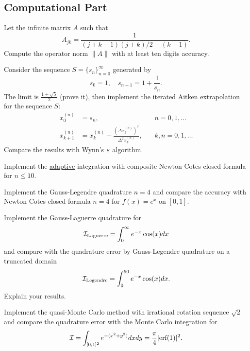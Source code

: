 \subsection{Computational Part}
\begin{problem}
    Let the infinite matrix $A$ such that $$A_{jk} = \frac{1}{(j+k-1)(j+k)/2 - (k-1)}.$$
    Compute the operator norm $\|A\|$ with at least ten digits accuracy.
\end{problem}
\begin{problem}\label{Exer: 4-It-Aitken}
    Consider the sequence $S = \{s_n\}_{n = 0}^{\infty}$ generated by 
    \begin{equation}
        s_0 = 1,\quad s_{n+1} = 1 + \frac{1}{s_{n}}.
    \end{equation}
    The limit is $\frac{1+\sqrt{5}}{2}$ (prove it), then implement the iterated Aitken extrapolation for the sequence $S$: 
    \begin{equation}
    \begin{aligned}
           x_0^{(n)} &= s_n ,\quad &n = 0, 1, \dots\\
           x_{k+1}^{(n)} &= x_k^{(n)} - \frac{( \Delta x_{k}^{(n)} )^2}{\Delta^2 x_k^{(n)}}, \quad &k, n = 0, 1, \dots
    \end{aligned}
    \end{equation}
    Compare the results with Wynn's $\varepsilon$ algorithm.
\end{problem}
\begin{problem}
    Implement the \underline{adaptive} integration with composite Newton-Cotes closed formula for $n \le 10$. 
\end{problem}

\begin{problem}
    Implement the Gauss-Legendre quadrature $n=4$ and compare the accuracy with Newton-Cotes closed formula $n=4$ for $f(x) = e^x$ on $[0, 1]$.
\end{problem}
\begin{problem}
    Implement the Gauss-Laguerre quadrature for 
    \begin{equation}
        \mathcal I_{\textrm{Laguerre}} = \int_0^{\infty} e^{-x} \cos(x) dx 
    \end{equation}
    and compare with the quadrature error by Gauss-Legendre quadrature on a truncated domain 
    \begin{equation}
        \mathcal I_{\textrm{Legendre}} = \int_{0}^{50} e^{-x} \cos(x) dx.
    \end{equation}
    Explain your results.
\end{problem}
\begin{problem}
    Implement the quasi-Monte Carlo method with irrational rotation sequence $\sqrt{2}$ and compare the quadrature error with the Monte Carlo integration for  
    $$\mathcal I = \int_{[0, 1]^2} e^{ -(x^2 + y^2) } dx d y = \frac{\pi}{4} |\textrm{erf}(1)|^2. $$
\end{problem}


